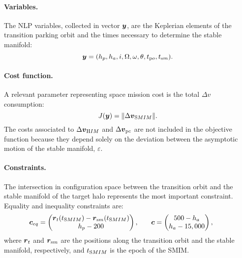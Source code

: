 \paragraph{Variables.}The {NLP} variables, collected in vector $\boldsymbol{y}$, are the Keplerian elements of the transition parking orbit and the times necessary to determine the stable manifold:
%
\begin{equation}
\boldsymbol{y} = (h_p,h_a,i,\Omega,\omega,\theta,t_{\textrm po},t_{\textrm sm}).
\end{equation}
%

\paragraph{Cost function.} A relevant parameter representing space mission cost is the total $\Delta v$ consumption:
%
\begin{equation}
J(\boldsymbol{y}) = \|\Delta\boldsymbol{v}_{\textrm SMIM}\|.
\end{equation}
%
The costs associated to $\Delta\boldsymbol{v}_{\textrm HIM}$ and $\Delta\boldsymbol{v}_{\textrm pc}$ are not included in the objective function because they depend solely on the deviation between the asymptotic motion of the stable manifold, \ie $\varepsilon$.

\paragraph{Constraints.} 
The intersection in configuration space between the transition orbit and the stable manifold of the target halo represents the most important constraint. Equality and inequality constraints are:
%
\begin{align}
&\begin{aligned}
\boldsymbol{c}_{eq} &= \begin{pmatrix}
\boldsymbol{r}_t(t_{\textrm SMIM})-\boldsymbol{r}_{\textrm sm}(t_{\textrm SMIM}) \\
h_p-200
\end{pmatrix},
\end{aligned}
&
&\begin{aligned}
\boldsymbol{c} &= \begin{pmatrix}
500-h_a \\
h_a-15,000
\end{pmatrix},
\end{aligned}
\end{align}
%
where $\boldsymbol{r}_t$ and $\boldsymbol{r}_{\textrm sm}$ are the positions along the transition orbit and the stable manifold, respectively, and $t_{\textrm SMIM}$ is the epoch of the {SMIM}.
%
